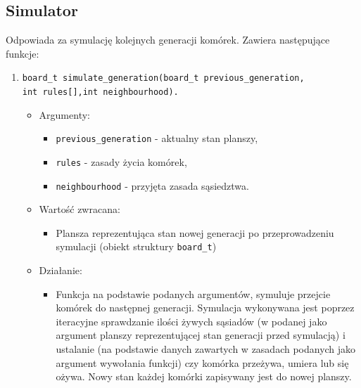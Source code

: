 \documentclass[a4paper,11pt, notitlepage ]{article}
\begin{document}
\subsection{Simulator}
Odpowiada za symulację kolejnych generacji komórek. Zawiera następujące funkcje:
\begin{enumerate}

\item \verb+board_t simulate_generation(board_t previous_generation,+ \\\verb+int rules[],int neighbourhood).+
\begin{itemize}
\item Argumenty:
\begin{itemize}
\item \verb+previous_generation+ - aktualny stan planszy,
\item \verb+rules+ - zasady życia komórek,
\item \verb+neighbourhood+ - przyjęta zasada sąsiedztwa.
\end{itemize}
\item Wartość zwracana:
\begin{itemize}
\item Plansza reprezentująca stan nowej generacji po przeprowadzeniu symulacji (obiekt struktury \verb+board_t+)
\end{itemize}
\item Działanie:
\begin{itemize}
\item Funkcja na podstawie podanych argumentów, symuluje przejcie komórek do następnej generacji. Symulacja wykonywana jest poprzez iteracyjne sprawdzanie ilości żywych sąsiadów 
(w podanej jako argument planszy reprezentującej stan generacji przed symulacją) i ustalanie (na podstawie danych zawartych w zasadach podanych jako argument wywołania funkcji) czy komórka przeżywa, umiera lub się ożywa.
Nowy stan każdej komórki zapisywany jest do nowej planszy.
\end{itemize}
\end{itemize}



\end{enumerate}
\end{document}
